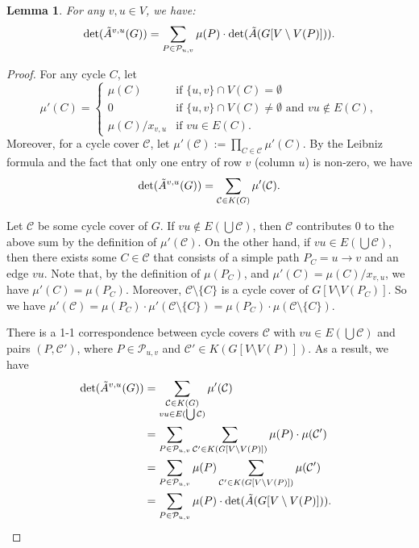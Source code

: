\documentclass[11pt]{article}
\newtheorem{lemma}[theorem]{Lemma}
\begin{document}
{\begin{lemma}\label{l:sumpath}
  For any $v,u\in V$, we have:
  $$\det(\tilde{A}^{v,u}(G))=\sum_{P\in \mathcal{P}_{u,v}} \mu(P)\cdot \det(\tilde{A}(G[V\setminus V(P)])).$$
\end{lemma}
\begin{proof}
  For any cycle $C$, let 
  $$\mu'(C)=\begin{cases}\mu(C) & \text{if } \{u,v\}\cap V(C)=\emptyset \\0 & \text{if } \{u,v\}\cap V(C)\neq \emptyset \text{ and } vu\notin E(C),\\
  \mu(C)/x_{v,u} & \text{if } vu\in E(C).\end{cases}$$
  Moreover, for a cycle cover $\mathcal{C}$, let $\mu'(\mathcal{C}):=\prod_{C\in\mathcal{C}} \mu'(C)$.
  By the Leibniz formula and the fact that only one entry of row $v$ (column $u$) is non-zero,
  we have
  $$\det(\tilde{A}^{v,u}(G))=\sum_{\mathcal{C}\in K(G)} \mu'(\mathcal{C}).$$

  Let $\mathcal{C}$ be some cycle cover of $G$. If $vu\notin E(\bigcup\mathcal{C})$,
  then $\mathcal{C}$ contributes $0$ to the above sum by the definition of $\mu'(\mathcal{C})$.
  On the other hand, if $vu\in E(\bigcup\mathcal{C})$, then there exists some $C\in\mathcal{C}$
  that consists of a simple path $P_C=u\to v$ and an edge $vu$.
  Note that, by the definition of $\mu(P_C)$, and $\mu'(C)=\mu(C)/x_{v,u}$, we have
  $\mu'(C)=\mu(P_C)$. Moreover, $\mathcal{C}\setminus\{C\}$ is a cycle cover
  of $G[V\setminus V(P_C)]$.
  So we have $\mu'(\mathcal{C})=\mu(P_C)\cdot \mu'(\mathcal{C}\setminus\{C\})=\mu(P_C)\cdot \mu(\mathcal{C}\setminus \{C\})$.

  There is a 1-1 correspondence between cycle covers $\mathcal{C}$ with $vu\in E(\bigcup\mathcal{C})$
  and pairs $(P,\mathcal{C}')$, where $P\in\mathcal{P}_{u,v}$ and $\mathcal{C}'\in K(G[V\setminus V(P)])$.
  As a result, we have
  \begin{align*}
    \det(\tilde{A}^{v,u}(G))&=\sum_{\substack{\mathcal{C}\in K(G)\\ vu\in E(\bigcup\mathcal{C})}}\mu'(\mathcal{C})\\
                    &=\sum_{P\in \mathcal{P}_{u,v}}\sum_{\mathcal{C}'\in K(G[V\setminus V(P)])}\mu(P)\cdot \mu(\mathcal{C}')\\
                    &=\sum_{P\in \mathcal{P}_{u,v}}\mu(P)\sum_{\mathcal{C}'\in K(G[V\setminus V(P)])}\mu(\mathcal{C}')\\
                    &=\sum_{P\in \mathcal{P}_{u,v}}\mu(P)\cdot \det(\tilde{A}(G[V\setminus V(P)])).\hspace{2mm}\qedhere
  \end{align*}
\end{proof}

}
\end{document}
